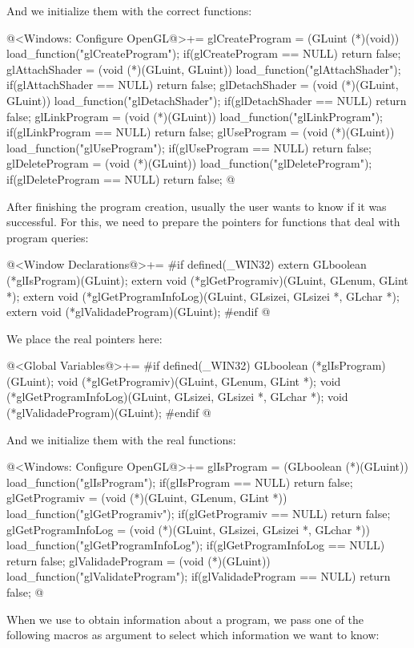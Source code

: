 And we initialize them with the correct functions:

\iniciocodigo
@<Windows: Configure OpenGL@>+=
glCreateProgram = (GLuint (*)(void)) load_function("glCreateProgram");
if(glCreateProgram == NULL) return false;
glAttachShader = (void (*)(GLuint, GLuint)) load_function("glAttachShader");
if(glAttachShader == NULL) return false;
glDetachShader = (void (*)(GLuint, GLuint)) load_function("glDetachShader");
if(glDetachShader == NULL) return false;
glLinkProgram = (void (*)(GLuint)) load_function("glLinkProgram");
if(glLinkProgram == NULL) return false;
glUseProgram = (void (*)(GLuint)) load_function("glUseProgram");
if(glUseProgram == NULL) return false;
glDeleteProgram = (void (*)(GLuint)) load_function("glDeleteProgram");
if(glDeleteProgram == NULL) return false;
@
\fimcodigo

After finishing the program creation, usually the user wants to know
if it was successful.  For this, we need to prepare the pointers for
functions that deal with program queries:

\iniciocodigo
@<Window Declarations@>+=
#if defined(_WIN32)
extern GLboolean (*glIsProgram)(GLuint);
extern void (*glGetProgramiv)(GLuint, GLenum, GLint *);
extern void (*glGetProgramInfoLog)(GLuint, GLsizei, GLsizei *, GLchar *);
extern void (*glValidadeProgram)(GLuint);
#endif
@
\fimcodigo

We place the real pointers here:

\iniciocodigo
@<Global Variables@>+=
#if defined(_WIN32)
GLboolean (*glIsProgram)(GLuint);
void (*glGetProgramiv)(GLuint, GLenum, GLint *);
void (*glGetProgramInfoLog)(GLuint, GLsizei, GLsizei *, GLchar *);
void (*glValidadeProgram)(GLuint);
#endif
@
\fimcodigo

And we initialize them with the real functions:

\iniciocodigo
@<Windows: Configure OpenGL@>+=
glIsProgram = (GLboolean (*)(GLuint)) load_function("glIsProgram");
if(glIsProgram == NULL) return false;
glGetProgramiv = (void (*)(GLuint, GLenum, GLint *))
                    load_function("glGetProgramiv");
if(glGetProgramiv == NULL) return false;
glGetProgramInfoLog = (void (*)(GLuint, GLsizei, GLsizei *, GLchar *))
                          load_function("glGetProgramInfoLog");
if(glGetProgramInfoLog == NULL) return false;
glValidadeProgram = (void (*)(GLuint)) load_function("glValidateProgram");
if(glValidadeProgram == NULL) return false;
@
\fimcodigo

When we use  to obtain information about a
program, we pass one of the following macros as argument to select
which information we want to know:

